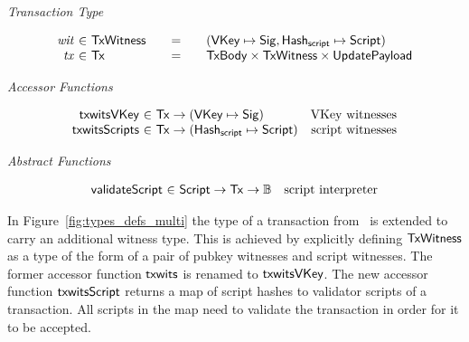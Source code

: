 \documentclass[11pt,a4paper,dvipsnames]{article}
\newcommand{\Bool}{\ensuremath{\mathbb{B}}}
\newcommand{\Tx}{\type{Tx}}
\newcommand{\TxWitness}{\type{TxWitness}}
\newcommand{\TxBody}{\type{TxBody}}
\newcommand{\HashScr}{\type{Hash_{script}}}
\newcommand{\UpdatePayload}{\type{UpdatePayload}}
\newcommand{\Script}{\type{Script}}
\newcommand{\VKey}{\type{VKey}}
\newcommand{\Sig}{\type{Sig}}
\theoremstyle{definition}
\begin{document}
\begin{figure*}[hbt]
  \emph{Transaction Type}

  \begin{equation*}
    \begin{array}{r@{~\in~}l@{\qquad=\qquad}l}
      \var{wit} & \TxWitness & (\VKey \mapsto \Sig, \HashScr \mapsto \Script)
      \\
      \var{tx}
      & \Tx
      & \TxBody \times \TxWitness \times \UpdatePayload
      \\
    \end{array}
  \end{equation*}

  \emph{Accessor Functions}

  \begin{equation*}
    \begin{array}{r@{~\in~}lr}
      \fun{txwitsVKey} & \Tx \to (\VKey \mapsto \Sig) & \text{VKey witnesses} \\
      \fun{txwitsScripts} & \Tx \to (\HashScr \mapsto \Script) & \text{script witnesses}
    \end{array}
  \end{equation*}

  \emph{Abstract Functions}

  \begin{equation*}
    \begin{array}{r@{~\in~}lr}
      \fun{validateScript} & \Script \to \Tx \to \Bool & \text{script interpreter}
    \end{array}
  \end{equation*}
  \caption{Types for Transaction Inputs with Scripts}
  \label{fig:types_defs_multi}
\end{figure*}

In Figure~\ref{fig:types_defs_multi} the type of a transaction
from~\cite{shelley_formal_spec} is extended to carry an additional witness
type. This is achieved by explicitly defining $\TxWitness$ as a type of the form
of a pair of pubkey witnesses and script witnesses. The former accessor function
$\mathsf{txwits}$ is renamed to $\mathsf{txwitsVKey}$. The new accessor function
$\mathsf{txwitsScript}$ returns a map of script hashes to validator scripts of a
transaction. All scripts in the map need to validate the transaction in order
for it to be accepted.
\end{document}
